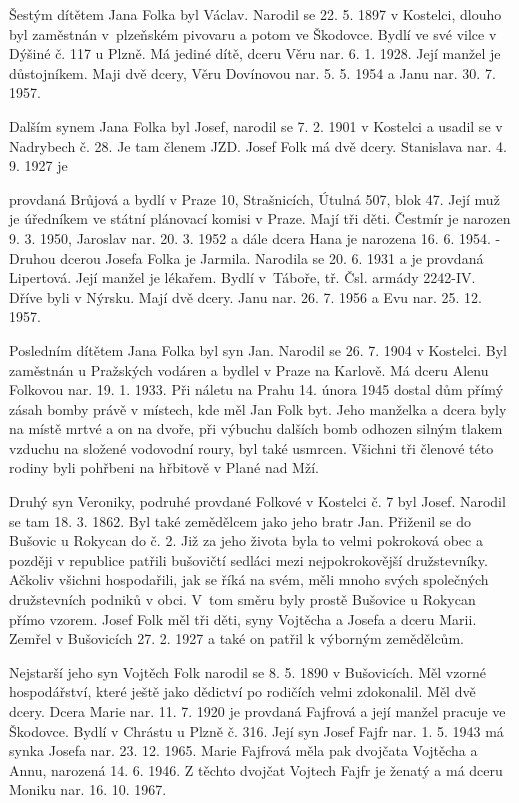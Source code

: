 \documentclass[../dejiny-rodu-prusiku.tex]{subfiles}
\begin{document}
Šestým dítětem Jana Folka byl Václav. Narodil se 22. 5. 1897 v Kostelci, dlouho byl zaměstnán v plzeňském pivovaru a potom ve Škodovce. Bydlí ve své vilce v Dýšiné č. 117 u Plzně. Má jediné dítě, dceru Věru nar. 6. 1. 1928. Její manžel je důstojníkem. Maji dvě dcery, Věru Dovínovou nar. 5. 5. 1954 a Janu nar. 30. 7. 1957.

Dalším synem Jana Folka byl Josef, narodil se 7. 2. 1901 v Kostelci a usadil se v Nadrybech č. 28. Je tam členem JZD. Josef Folk má dvě dcery. Stanislava nar. 4. 9. 1927 je

provdaná Brůjová a bydlí v Praze 10, Strašnicích, Útulná 507, blok 47. Její muž je úředníkem ve státní plánovací komisi v Praze. Mají tři děti. Čestmír je narozen 9. 3. 1950, Jaroslav nar. 20. 3. 1952 a dále dce­ra Hana je narozena 16. 6. 1954. - Druhou dcerou Josefa Folka je Jarmila. Narodila se 20. 6. 1931 a je provdaná Lipertová. Její manžel je lékařem. Bydlí v Táboře, tř. Čsl. armády 2242-IV. Dříve byli v Nýrsku. Mají dvě dcery. Janu nar. 26. 7. 1956 a Evu nar. 25. 12. 1957.

Posledním dítětem Jana Folka byl syn Jan. Narodil se 26. 7. 1904 v Kostelci. Byl zaměstnán u Pražských vodá­ren a bydlel v Praze na Karlově. Má dceru Alenu Folkovou nar. 19. 1. 1933. Při náletu na Prahu 14. února 1945 dostal dům přímý zásah bomby právě v místech, kde měl Jan Folk byt. Jeho manželka a dcera byly na místě mrt­vé a on na dvoře, při výbuchu dalších bomb odhozen silným tlakem vzduchu na složené vodovodní roury, byl také usmrcen. Všichni tři členové této rodiny byli pohřbeni na hřbitově v Plané nad Mží.

Druhý syn Veroniky, podruhé provdané Folkové v Kostelci č. 7 byl Josef. Narodil se tam 18. 3. 1862. Byl také zemědělcem jako jeho bratr Jan. Přiženil se do Bušovic u Rokycan do č. 2. Již za jeho života byla to vel­mi pokroková obec a později v republice patřili bušovičtí sedláci mezi nejpokrokovější družstevníky. Ačko­liv všichni hospodařili, jak se říká na svém, měli mnoho svých společných družstevních podniků v obci. V tom směru byly prostě Bušovice u Rokycan přímo vzorem. Josef Folk měl tři děti, syny Vojtěcha a Josefa a dceru Marii. Zemřel v Bušovicích 27. 2. 1927 a také on patřil k výborným zemědělcům.

Nejstarší jeho syn Vojtěch Folk narodil se 8. 5. 1890 v Bušovicích. Měl vzorné hospodářství, které ještě jako dědictví po rodičích velmi zdokonalil. Měl dvě dcery. Dcera Marie nar. 11. 7. 1920 je provdaná Fajfrová a je­jí manžel pracuje ve Škodovce. Bydlí v Chrástu u Plzně č. 316. Její syn Josef Fajfr nar. 1. 5. 1943 má synka Josefa nar. 23. 12. 1965. Marie Fajfrová měla pak dvojčata Vojtěcha a Annu, narozená 14. 6. 1946. Z těchto dvojčat Vojtech Fajfr je ženatý a má dceru Moniku nar. 16. 10. 1967.
\end{document}
